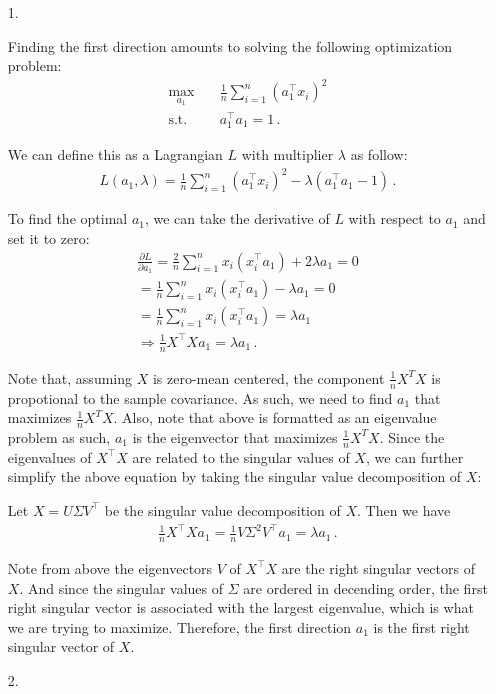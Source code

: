 \documentclass[a4paper]{article}
\theoremstyle{definition}
\newenvironment{soln}{
  \leavevmode\color{blue}\ignorespaces
}{}
\begin{document}
\begin{soln}
  \begin{itemize}
    \item [1.]
        \begin{soln}
            Finding the first direction amounts to solving the following optimization problem:
            \begin{align*}
                \max_{a_1} \quad & \frac{1}{n} \sum_{i=1}^n (a_1^\top x_i)^2 \\
                \text{s.t.} \quad & a_1^\top a_1 = 1\,.
            \end{align*}

            We can define this as a Lagrangian $L$ with multiplier $\lambda$ as follow:
            \begin{align*}
                L(a_1, \lambda) = \frac{1}{n} \sum_{i=1}^n (a_1^\top x_i)^2 - \lambda (a_1^\top a_1 - 1)\,.
            \end{align*}

            To find the optimal $a_1$, we can take the derivative of $L$ with respect to $a_1$ and set it to zero:
            \begin{align*}
                \frac{\partial L}{\partial a_1} = \frac{2}{n} \sum_{i=1}^n x_i (x_i^\top a_1) + 2 \lambda a_1 = 0 \\
                =  \frac{1}{n} \sum_{i=1}^n x_i (x_i^\top a_1) - \lambda a_1 = 0 \\
                = \frac{1}{n} \sum_{i=1}^n x_i (x_i^\top a_1) =  \lambda a_1 \\
                \Rightarrow \frac{1}{n} X^\top X a_1 =  \lambda a_1\,.
            \end{align*}
          
          Note that, assuming $X$ is zero-mean centered, the component $\frac{1}{n} X^T X$ is propotional to the sample covariance. As such, we need to find $a_1$ that maximizes  $\frac{1}{n} X^T X$. Also, note that above is formatted as an eigenvalue problem as such, $a_1$ is the eigenvector that maximizes  $\frac{1}{n} X^T X$.  Since the eigenvalues of $X^\top X$ are related to the singular values of $X$, we can further simplify the above equation by taking the singular value decomposition of $X$:

          Let $X = U \Sigma V^\top$ be the singular value decomposition of $X$. Then we have
          \begin{align*}
            \frac{1}{n} X^\top X a_1 = \frac{1}{n} V \Sigma^2 V^\top a_1 = \lambda a_1\,.
          \end{align*}

          Note from above the eigenvectors $V$ of $X^\top X$ are the right singular vectors of $X$. And since the singular values of $\Sigma$ are ordered in decending order, the first right singular vector is associated with the largest eigenvalue, which is what we are trying to maximize. Therefore, the first direction $a_1$ is the first right singular vector of $X$.
            
        \end{soln}
    \item [2.]
  \end{itemize}
\end{soln}
\end{document}
